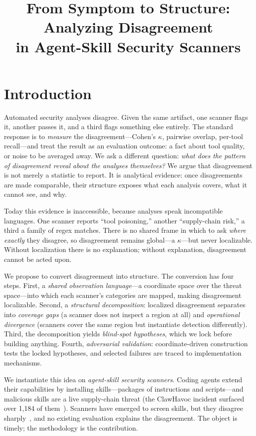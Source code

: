 \documentclass[sigconf,nonacm]{acmart}
\title{From Symptom to Structure: Analyzing Disagreement\\in Agent-Skill Security Scanners}
\begin{document}
\maketitle

\section{Introduction}
\label{sec:intro}

Automated security analyses disagree.
Given the same artifact, one scanner flags it, another passes it, and a third flags something else entirely.
The standard response is to \emph{measure} the disagreement---Cohen's $\kappa$, pairwise overlap, per-tool recall---and treat the result as an evaluation outcome: a fact about tool quality, or noise to be averaged away.
We ask a different question: \emph{what does the pattern of disagreement reveal about the analyses themselves?}
We argue that disagreement is not merely a statistic to report.
It is analytical evidence: once disagreements are made comparable, their structure exposes what each analysis covers, what it cannot see, and why.

Today this evidence is inaccessible, because analyses speak incompatible languages.
One scanner reports ``tool poisoning,'' another ``supply-chain risk,'' a third a family of regex matches.
There is no shared frame in which to ask \emph{where exactly} they disagree, so disagreement remains global---a $\kappa$---but never localizable.
Without localization there is no explanation; without explanation, disagreement cannot be acted upon.

We propose to convert disagreement into structure.
The conversion has four steps.
First, a \emph{shared observation language}---a coordinate space over the threat space---into which each scanner's categories are mapped, making disagreement localizable.
Second, a \emph{structural decomposition}: localized disagreement separates into \emph{coverage gaps} (a scanner does not inspect a region at all) and \emph{operational divergence} (scanners cover the same region but instantiate detection differently).
Third, the decomposition yields \emph{blind-spot hypotheses}, which we lock before building anything.
Fourth, \emph{adversarial validation}: coordinate-driven construction tests the locked hypotheses, and selected failures are traced to implementation mechanisms.

We instantiate this idea on \emph{agent-skill security scanners}.
Coding agents extend their capabilities by installing skills---packages of instructions and scripts---and malicious skills are a live supply-chain threat (the ClawHavoc incident surfaced over 1{,}184 of them~\cite{clawhub2026}).
Scanners have emerged to screen skills, but they disagree sharply~\cite{clawhub2026,locatejudge2026}, and no existing evaluation explains the disagreement.
The object is timely; the methodology is the contribution.
\end{document}
